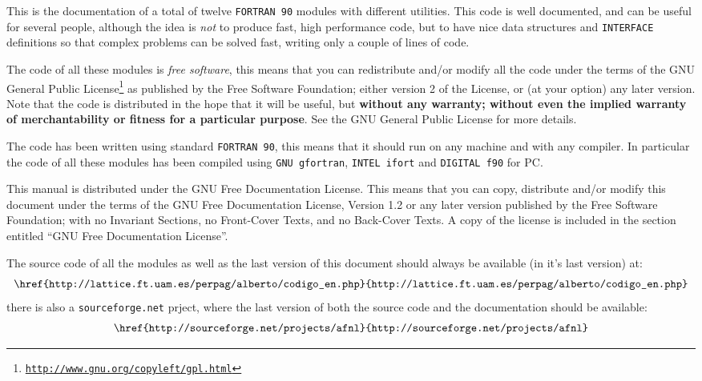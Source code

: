 
This is the documentation of a total of twelve \texttt{FORTRAN 90}
modules with different utilities. This code is well documented, and
can be useful for several people, although the idea is \emph{not} to
produce fast, high performance code, but to have nice data structures
and \texttt{INTERFACE} definitions so that complex problems can be
solved fast, writing only a couple of lines of code. 

The code of all these modules is \emph{free software}, this means that
you can redistribute and/or modify all the code under the terms of the
GNU General Public
License\footnote{\href{http://www.gnu.org/copyleft/gpl.html}{\texttt{http://www.gnu.org/copyleft/gpl.html}}} 
as published by the Free Software Foundation; either version 2
of the License, or (at your option) any later version. Note that the
code is distributed in the hope that it will be useful, but
\textbf{without any warranty; without even the implied warranty of
  merchantability or fitness for a particular purpose}.  See the GNU
General Public License for more details. 

The code has been written using standard \texttt{FORTRAN 90}, this
means that it should run on any machine and with any compiler. In
particular the code of all these modules has been compiled using
\texttt{GNU gfortran}, \texttt{INTEL ifort} and \texttt{DIGITAL f90}
for PC.

This manual is distributed under the GNU Free Documentation
License. This means that you can copy, distribute and/or modify this
document under the terms of the GNU Free Documentation License,
Version 1.2 or any later version published by the Free Software
Foundation; with no Invariant Sections, no Front-Cover Texts, and no
Back-Cover Texts.  A copy of the license is included in the section
entitled ``GNU Free Documentation License''.

The source code of all the modules as well as the last version of this
document should always be available (in it's last version) at:
\begin{displaymath}
  \texttt{\href{http://lattice.ft.uam.es/perpag/alberto/codigo\_en.php}{\texttt{http://lattice.ft.uam.es/perpag/alberto/codigo\_en.php}}}
\end{displaymath}
there is also a \texttt{sourceforge.net} prject, where the last
version of both the source code and the documentation should be
available:
\begin{displaymath}
  \texttt{\href{http://sourceforge.net/projects/afnl}{\texttt{http://sourceforge.net/projects/afnl}}}
\end{displaymath}

